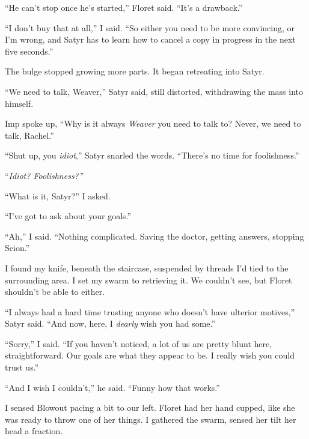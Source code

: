 ``He can't stop once he's started,'' Floret said.  ``It's a drawback.''



``I don't buy that at all,'' I said.  ``So either you need to be more convincing, or I'm wrong, and Satyr has to learn how to cancel a copy in progress in the next five seconds.''



The bulge stopped growing more parts.  It began retreating into Satyr.



``We need to talk, Weaver,'' Satyr said, still distorted, withdrawing the mass into himself.



Imp spoke up, ``Why is it always \emph{Weaver }you need to talk to?  Never, we need to talk, Rachel.''



``Shut up, you \emph{idiot},'' Satyr snarled the words.  ``There's no time for foolishness.''



``\emph{Idiot?  Foolishness?''}



``What is it, Satyr?''  I asked.



``I've got to ask about your goals.''



``Ah,'' I said.  ``Nothing complicated.  Saving the doctor, getting answers, stopping Scion.''



I found my knife, beneath the staircase, suspended by threads I'd tied to the surrounding area.  I set my swarm to retrieving it.  We couldn't see, but Floret shouldn't be able to either.



``I always had a hard time trusting anyone who doesn't have ulterior motives,'' Satyr said.  ``And now, here, I \emph{dearly} wish you had some.''



``Sorry,'' I said.  ``If you haven't noticed, a lot of us are pretty blunt here, straightforward.  Our goals are what they appear to be.  I really wish you could trust us.''



``And I wish I couldn't,'' he said.  ``Funny how that works.''



I sensed Blowout pacing a bit to our left.  Floret had her hand cupped, like she was ready to throw one of her things.  I gathered the swarm, sensed her tilt her head a fraction.



